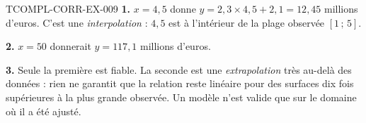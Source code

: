 \begin{corrige}{TCOMPL-CORR-EX-009}
\textbf{1.} $x=4{,}5$ donne $y=2{,}3\times4{,}5+2{,}1=12{,}45$ millions
d'euros. C'est une \emph{interpolation} : $4{,}5$ est à l'intérieur de la
plage observée $[1\,;\,5]$.

\textbf{2.} $x=50$ donnerait $y=117{,}1$ millions d'euros.

\textbf{3.} Seule la première est fiable. La seconde est une
\emph{extrapolation} très au-delà des données : rien ne garantit que la
relation reste linéaire pour des surfaces dix fois supérieures à la plus
grande observée. Un modèle n'est valide que sur le domaine où il a été ajusté.
\end{corrige}
